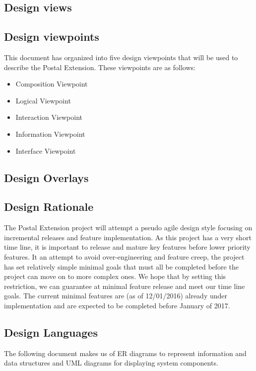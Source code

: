 \documentclass[letterpaper,10pt,titlepage,draftclsnofoot,onecolumn,onesided] {IEEEtran}
\begin{document}
\subsection{Design views}

\subsection{Design viewpoints}
This document has organized into five design viewpoints that will be used to describe the Postal Extension.
These viewpoints are as follows:
\begin {itemize}
\item Composition Viewpoint
\item Logical Viewpoint
\item Interaction Viewpoint
\item Information Viewpoint
\item Interface Viewpoint
\end {itemize}

\subsection{Design Overlays}

\subsection{Design Rationale}
The Postal Extension project will attempt a pseudo agile design style focusing on incremental releases and feature implementation.
As this project has a very short time line, it is important to release and mature key features before lower priority features. 
It an attempt to avoid over-engineering and feature creep, the project has set relatively simple minimal goals that must all be completed before the project can move on to more complex ones.
We hope that by setting this restriction, we can guarantee at minimal feature release and meet our time line goals.
The current minimal features are (as of 12/01/2016) already under implementation and are expected to be completed before January of 2017.


\subsection{Design Languages}
The following document makes us of ER diagrams to represent information and data structures and UML diagrams for displaying system components. 
\end{document}
